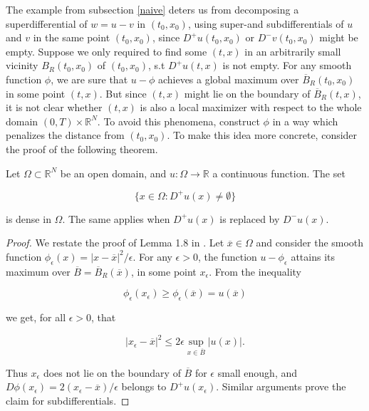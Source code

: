 The example from subsection \ref{naive} deters us from decomposing a superdifferential of $ w = u - v $ in $ (t_0, x_0) $, using super-and subdifferentials of $ u $ and $ v $ in the same point $ (t_0, x_0) $, since $ D^{+}u(t_0, x_0) $ or $ D^{-}v(t_0, x_0) $ might be empty. Suppose we only required to find some $ (t, x) $ in an arbitrarily small vicinity $ B_R(t_0, x_0) $ of $ (t_0, x_0) $, s.t $ D^{+}u(t, x) $ is not empty. For any smooth function $ \phi $, we are sure that $ u - \phi $ achieves a global maximum over $ \overline{B}_R(t_0, x_0) $ in some point $ (t, x) $. But since $ (t, x) $ might lie on the boundary of $ \overline{B}_R(t, x) $, it is not clear whether $ (t, x) $ is also a local maximizer with respect to the whole domain $ \left( 0, T \right) \times \mathbb{R}^{N} $. To avoid this phenomena, construct $ \phi $ in a way which penalizes the distance from $ (t_0, x_0) $. To make this idea more concrete, consider the proof of the following theorem.
		
		\begin{theorem}
			\label{density}
			Let $ \Omega \subset \mathbb{R}^{N} $ be an open domain, and $ u : \Omega \to \mathbb{R} $ a continuous function. The set
			
			\begin{equation*}
				\big\{ x \in \Omega : D^{+}u(x) \neq \emptyset \big\}
			\end{equation*}
			
			is dense in $ \Omega $. The same applies when $ D^{+}u(x) $ is replaced by $ D^{-}u(x) $.
			
			\begin{proof}
				We restate the proof of Lemma 1.8 in \cite[p.~30]{bardi2008optimal}. Let $ \overline{x} \in \Omega $ and consider the smooth function $ \phi_{\epsilon}(x) = \lvert x - \overline{x} \rvert^2 /  \epsilon $. For any $ \epsilon > 0 $, the function $ u - \phi_{\epsilon} $ attains its maximum over $ \overline{B} = \overline{B}_R(\overline{x}) $, in some point $ x_{\epsilon} $. From the inequality
				
				\begin{equation*}
					\phi_{\epsilon}(x_{\epsilon}) \geq \phi_{\epsilon}(\overline{x}) = u(\overline{x})
				\end{equation*}
				
				we get, for all $ \epsilon > 0 $, that
				
				\begin{equation*}
					\lvert x_{\epsilon} - \overline{x} \rvert^2 \leq 2 \epsilon \sup\limits_{x \in \overline{B}} \lvert u(x) \rvert .
				\end{equation*}
				
				Thus $ x_{\epsilon} $ does not lie on the boundary of $ \overline{B} $ for $ \epsilon $ small enough, and $ D\phi(x_{\epsilon}) = 2(x_{\epsilon} - \overline{x}) / \epsilon $ belongs to $ D^{+}u(x_{\epsilon}) $. Similar arguments prove the claim for subdifferentials.
			\end{proof}
		\end{theorem}
	
